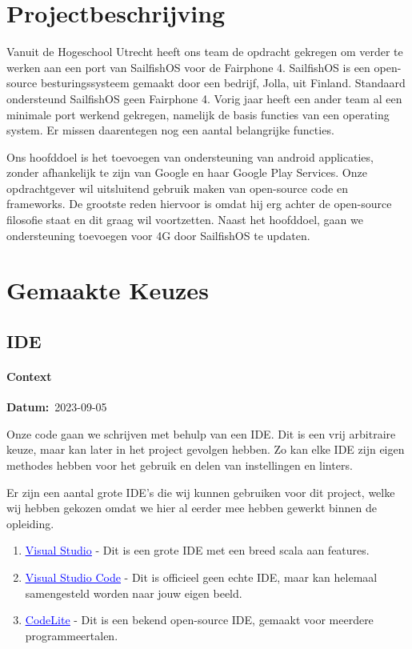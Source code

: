 \documentclass[a4paper]{report}
\newcommand{\styledhref}[2]{%
    \href{#1}{\textcolor{blue}{\underline{#2}}} %
}
\newcommand{\personalbox}{
  \begin{tcolorbox}[hbox, colback=green!5!white,colframe=green!75!black,
    left=.1mm, right=.1mm, top=.1mm, bottom=.1mm, fontupper=\scriptsize\sffamily]
    Persoonlijke Keuze
  \end{tcolorbox}
}
\newcommand{\personalchoice}[1]{
  \section[ #1 ]{#1~\mbox{\raisebox{-2.5pt}{\personalbox}}}
}
\newcommand{\timestamp}[1]{
  \mbox{\scriptsize \textbf{Datum:} #1} \smallbreak
}
\begin{document}
\begingroup
\let\clearpage\relax
\chapter{Projectbeschrijving}
Vanuit de Hogeschool Utrecht heeft ons team de opdracht gekregen om verder te werken aan een port van SailfishOS voor de Fairphone 4.
SailfishOS is een open-source besturingssysteem gemaakt door een bedrijf, Jolla, uit Finland. Standaard ondersteund SailfishOS geen Fairphone 4.
Vorig jaar heeft een ander team al een minimale port werkend gekregen, namelijk de basis functies van een operating system. Er missen daarentegen nog een aantal belangrijke functies.
\par \smallskip
Ons hoofddoel is het toevoegen van ondersteuning van android applicaties, zonder afhankelijk te zijn van Google en haar Google Play Services\texttrademark. 
Onze opdrachtgever wil uitsluitend gebruik maken van open-source code en frameworks. De grootste reden hiervoor is omdat hij erg achter de open-source filosofie staat en dit graag wil voortzetten.
Naast het hoofddoel, gaan we ondersteuning toevoegen voor 4G door SailfishOS te updaten.
\endgroup

\chapter{Gemaakte Keuzes}
\personalchoice{IDE}
\subsubsection{Context}
\timestamp{2023-09-05}
Onze code gaan we schrijven met behulp van een IDE. Dit is een vrij arbitraire keuze, maar kan later in het project gevolgen hebben. 
Zo kan elke IDE zijn eigen methodes hebben voor het gebruik en delen van instellingen en linters. 
\par\smallskip
Er zijn een aantal grote IDE's die wij kunnen gebruiken voor dit project, welke wij hebben gekozen omdat we hier al eerder mee hebben gewerkt binnen de opleiding.
\begin{enumerate}
  \item \styledhref{https://visualstudio.microsoft.com/}{Visual Studio} - Dit is een grote IDE met een breed scala aan features.
  \item \styledhref{https://code.visualstudio.com/}{Visual Studio Code} - Dit is officieel geen echte IDE, maar kan helemaal samengesteld worden naar jouw eigen beeld.
  \item \styledhref{https://codelite.org/}{CodeLite} - Dit is een bekend open-source IDE, gemaakt voor meerdere programmeertalen.
\end{enumerate}
\end{document}
